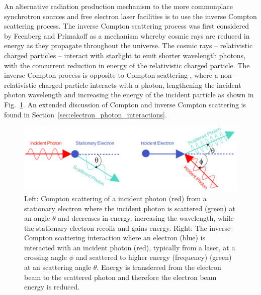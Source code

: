 \documentclass[../main.tex]{subfiles}
\begin{document}
An alternative radiation production mechanism to the more commonplace synchrotron sources and free electron laser facilities is to use the inverse Compton scattering process. The inverse Compton scattering process was first considered by Feenberg and Primakoff \cite{feenberg1948interaction} as a mechanism whereby cosmic rays are reduced in energy as they propagate throughout the universe. The cosmic rays -- relativistic charged particles -- interact with starlight to emit shorter wavelength photons, with the concurrent reduction in energy of the relativistic charged particle. The inverse Compton process is opposite to Compton scattering \cite{compton1923quantum}, where a non-relativistic charged particle interacts with a photon, lengthening the incident photon wavelength and increasing the energy of the incident particle as shown in Fig.~\ref{fig:intro_CS_ICS}. An extended discussion of Compton and inverse Compton scattering is found in Section~\ref{sec:electron_photon_interactions}. 
\begin{figure}[!h]
\centering
\includegraphics[width=\textwidth]{Figures/Introduction/CS_ICS_diagram_simple_fixed.pdf}
\caption{Left: Compton scattering of a incident photon (red) from a stationary electron where the incident photon is scattered (green) at an angle $\theta$ and decreases in energy, increasing the wavelength, while the stationary electron recoils and gains energy. Right: The inverse Compton scattering interaction where an electron (blue) is interacted with an incident photon (red), typically from a laser, at a crossing angle $\phi$ and scattered to higher energy (frequency) (green) at an scattering angle $\theta$. Energy is transferred from the electron beam to the scattered photon and therefore the electron beam energy is reduced.}
\label{fig:intro_CS_ICS}
\end{figure}
\end{document}
